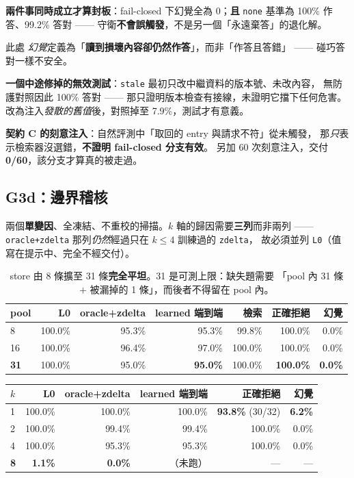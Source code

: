 \documentclass[11pt, a4paper]{article}
\begin{document}
\textbf{兩件事同時成立才算封板}：fail-closed 下幻覺全為 0；\textbf{且} \verb|none| 基準為
100\% 作答、99.2\% 答對 —— 守衛\textbf{不會誤觸發}，不是另一個「永遠棄答」的退化解。

此處 \emph{幻覺}定義為「\textbf{讀到損壞內容卻仍然作答}」，而非「作答且答錯」 ——
碰巧答對一樣不安全。

\textbf{一個中途修掉的無效測試}：\verb|stale| 最初只改中繼資料的版本號、未改內容，
無防護對照因此 100\% 答對 —— 那只證明版本檢查有接線，未證明它擋下任何危害。
改為注入\emph{發散的舊值}後，對照掉至 7.9\%，測試才有意義。

\textbf{契約 C 的刻意注入}：自然評測中「取回的 entry 與請求不符」從未觸發，
那\emph{只}表示檢索器沒選錯，\textbf{不證明 fail-closed 分支有效}。
另加 60 次刻意注入，交付 \textbf{0/60}，該分支才算真的被走過。

\subsection{G3d：邊界稽核}

兩個\textbf{單變因}、全凍結、不重校的掃描。$k$ 軸的歸因需要\textbf{三列}而非兩列 ——
\verb|oracle+zdelta| 那列\emph{仍然}經過只在 $k \leq 4$ 訓練過的 \verb|zdelta|，
故必須並列 \verb|L0|（值寫在提示中、完全不經交付）。

\begin{table}[h]
\centering
\small
\begin{tabular}{lrrrrrr}
\toprule
pool & L0 & oracle+zdelta & learned 端到端 & 檢索 & 正確拒絕 & 幻覺 \\
\midrule
8 & 100.0\% & 95.3\% & 95.3\% & 99.8\% & 100.0\% & 0.0\% \\
16 & 100.0\% & 96.4\% & 97.0\% & 100.0\% & 100.0\% & 0.0\% \\
\textbf{31} & 100.0\% & 95.0\% & \textbf{95.0\%} & 100.0\% & \textbf{100.0\%} & \textbf{0.0\%} \\
\bottomrule
\end{tabular}
\caption{store 由 8 條擴至 31 條\textbf{完全平坦}。31 是可測上限：缺失題需要
「pool 內 31 條 $+$ 被漏掉的 1 條」，而後者不得留在 pool 內。}
\end{table}

\begin{table}[h]
\centering
\small
\begin{tabular}{lrrrrr}
\toprule
$k$ & L0 & oracle+zdelta & learned 端到端 & 正確拒絕 & 幻覺 \\
\midrule
1 & 100.0\% & 100.0\% & 100.0\% & \textbf{93.8\%} (30/32) & \textbf{6.2\%} \\
2 & 100.0\% & 99.4\% & 99.4\% & 100.0\% & 0.0\% \\
4 & 100.0\% & 95.3\% & 95.3\% & 100.0\% & 0.0\% \\
\textbf{8} & \textbf{1.1\%} & \textbf{0.0\%} & （未跑）& --- & --- \\
\bottomrule
\end{tabular}
\end{table}
\end{document}
